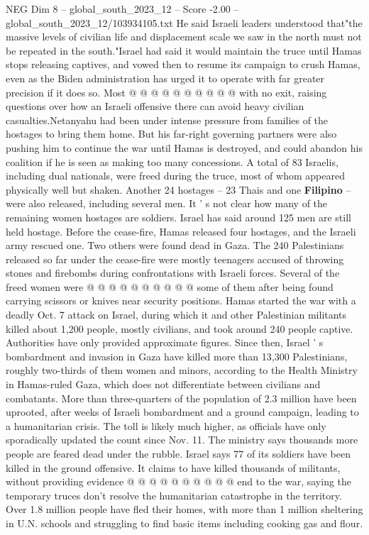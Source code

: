 \begin{textsample}{NEG Dim 8 – global\_south\_2023\_12 – Score -2.00 – global\_south\_2023\_12/103934105.txt}
He said Israeli leaders understood that"the massive levels of civilian life and displacement scale we saw in the north must not be repeated in the south."Israel had said it would maintain the truce until Hamas stops releasing captives, and vowed then to resume its campaign to crush Hamas, even as the Biden administration has urged it to operate with far greater precision if it does so.
Most @ @ @ @ @ @ @ @ @ @ with no exit, raising questions over how an Israeli offensive there can avoid heavy civilian casualties.Netanyahu had been under intense pressure from families of the hostages to bring them home.
But his far-right governing partners were also pushing him to continue the war until Hamas is destroyed, and could abandon his coalition if he is seen as making too many concessions.
A total of 83 Israelis, including dual nationals, were freed during the truce, most of whom appeared physically well but shaken.
Another 24 hostages -- 23 Thais and one \textbf{Filipino} -- were also released, including several men.
It ' s not clear how many of the remaining women hostages are soldiers.
Israel has said around 125 men are still held hostage.
Before the cease-fire, Hamas released four hostages, and the Israeli army rescued one.
Two others were found dead in Gaza.
The 240 Palestinians released so far under the cease-fire were mostly teenagers accused of throwing stones and firebombs during confrontations with Israeli forces.
Several of the freed women were @ @ @ @ @ @ @ @ @ @ some of them after being found carrying scissors or knives near security positions.
Hamas started the war with a deadly Oct. 7 attack on Israel, during which it and other Palestinian militants killed about 1,200 people, mostly civilians, and took around 240 people captive.
Authorities have only provided approximate figures.
Since then, Israel ' s bombardment and invasion in Gaza have killed more than 13,300 Palestinians, roughly two-thirds of them women and minors, according to the Health Ministry in Hamas-ruled Gaza, which does not differentiate between civilians and combatants.
More than three-quarters of the population of 2.3 million have been uprooted, after weeks of Israeli bombardment and a ground campaign, leading to a humanitarian crisis.
The toll is likely much higher, as officials have only sporadically updated the count since Nov. 11.
The ministry says thousands more people are feared dead under the rubble.
Israel says 77 of its soldiers have been killed in the ground offensive.
It claims to have killed thousands of militants, without providing evidence @ @ @ @ @ @ @ @ @ @ end to the war, saying the temporary truces don't resolve the humanitarian catastrophe in the territory.
Over 1.8 million people have fled their homes, with more than 1 million sheltering in U.N. schools and struggling to find basic items including cooking gas and flour.

\end{textsample}
